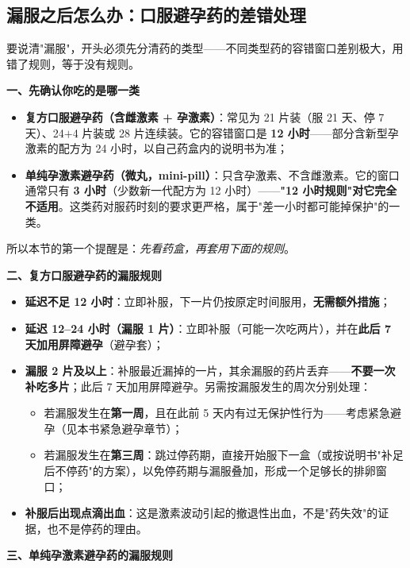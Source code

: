 \subsection{漏服之后怎么办：口服避孕药的差错处理}

要说清"漏服"，开头必须先分清药的类型——不同类型药的容错窗口差别极大，用错了规则，等于没有规则。

\textbf{一、先确认你吃的是哪一类}

\begin{itemize}
\item \textbf{复方口服避孕药（含雌激素 + 孕激素）}：常见为 21 片装（服 21 天、停 7 天）、24$+$4 片装或 28 片连续装。它的容错窗口是 \textbf{12 小时}——部分含新型孕激素的配方为 24 小时，以自己药盒内的说明书为准；
\item \textbf{单纯孕激素避孕药（微丸，mini-pill）}：只含孕激素、不含雌激素。它的窗口通常只有 \textbf{3 小时}（少数新一代配方为 12 小时）——\textbf{"12 小时规则"对它完全不适用}。这类药对服药时刻的要求更严格，属于"差一小时都可能掉保护"的一类。
\end{itemize}

所以本节的第一个提醒是：\emph{先看药盒，再套用下面的规则}。

\textbf{二、复方口服避孕药的漏服规则}

\begin{itemize}
\item \textbf{延迟不足 12 小时}：立即补服，下一片仍按原定时间服用，\textbf{无需额外措施}；
\item \textbf{延迟 12--24 小时（漏服 1 片）}：立即补服（可能一次吃两片），并在\textbf{此后 7 天加用屏障避孕}（避孕套）；
\item \textbf{漏服 2 片及以上}：补服最近漏掉的一片，其余漏服的药片丢弃——\textbf{不要一次补吃多片}；此后 7 天加用屏障避孕。另需按漏服发生的周次分别处理：
  \begin{itemize}
  \item 若漏服发生在\textbf{第一周}，且在此前 5 天内有过无保护性行为——考虑紧急避孕（见本书紧急避孕章节）；
  \item 若漏服发生在\textbf{第三周}：跳过停药期，直接开始服下一盒（或按说明书"补足后不停药"的方案），以免停药期与漏服叠加，形成一个足够长的排卵窗口；
  \end{itemize}
\item \textbf{补服后出现点滴出血}：这是激素波动引起的撤退性出血，不是"药失效"的证据，也不是停药的理由。
\end{itemize}

\textbf{三、单纯孕激素避孕药的漏服规则}

